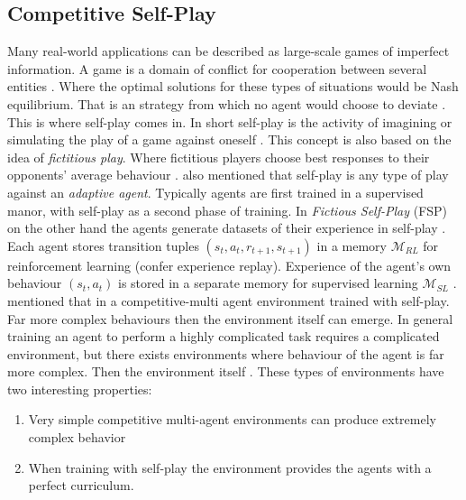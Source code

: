 \documentclass{kththesis}
\theoremstyle{definition}
\begin{document}
\subsection{Competitive Self-Play}
Many real-world applications can be described as large-scale games of imperfect information. A game is a domain of conflict for cooperation between several entities \parencite{heinrich2016deep}. Where the optimal solutions for these types of situations would be Nash equilibrium. That is an strategy from which no agent would choose to deviate \parencite{heinrich2016deep}. This is where self-play comes in. In short self-play is the activity of imagining or simulating the play of a game against oneself \parencite{heinrich2017reinforcement}. This concept is also based on the idea of \textit{fictitious play}.  Where fictitious players choose best responses to their opponents' average behaviour \parencite{heinrich2016deep}. 
\newline
\newline
\textcite{tampuu2017multiagent} also mentioned that self-play is any type of play against an \textit{adaptive agent}. Typically agents are first trained in a supervised manor, with self-play as a second phase of training. In \textit{Fictious Self-Play} (FSP) on the other hand the agents generate datasets of their experience in self-play \parencite{heinrich2016deep}.  Each agent stores transition tuples $(s_t, a_t, r_{t+1}, s_{t+1})$ in a memory $\mathcal{M}_{RL}$ for reinforcement learning (confer experience replay). Experience of the agent's own behaviour $(s_t, a_t)$ is stored in a separate memory for supervised learning $\mathcal{M}_{SL}$ \parencite{heinrich2016deep}.
\newline
\newline
\textcite{bansal2017emergent} mentioned that in a competitive-multi agent environment trained with self-play. Far more complex behaviours then the environment itself can emerge. In general training an agent to perform a highly complicated task requires a complicated environment, but there exists environments where behaviour of the agent is far more complex. Then the environment itself \parencite{bansal2017emergent}. These types of environments have two interesting properties:

\begin{enumerate}
    \item Very simple competitive multi-agent environments can produce extremely complex behavior
    \item When training with self-play the environment provides the agents with  a perfect curriculum.
\end{enumerate}
\end{document}
